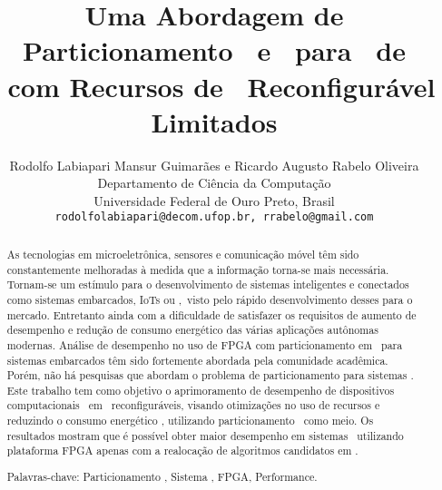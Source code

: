 \documentclass[a4paper, 10pt, conference]{ieeeconf}      %
\title{\LARGE \bf
Uma Abordagem de Particionamento \Hardware\ e \Software\ para \Design\ de \Wearables\ com Recursos de \Hardware\ Reconfigurável Limitados
}
\author{ \parbox{6 in}{\centering Rodolfo Labiapari Mansur Guimarães e Ricardo Augusto Rabelo Oliveira \\
         Departamento de Ciência da Computação\\
         Universidade Federal de Ouro Preto, Brasil\\
         {\tt\small rodolfolabiapari@decom.ufop.br, rrabelo@gmail.com}}
}
\begin{document}
\maketitle
\thispagestyle{empty}
\pagestyle{empty}

\begin{abstract}

As tecnologias em microeletrônica, sensores e comunicação móvel têm sido constantemente melhoradas à medida que a informação torna-se mais necessária. 
Tornam-se um estímulo para o desenvolvimento de sistemas inteligentes e conectados como sistemas embarcados, IoTs ou \wearables,\ visto pelo rápido desenvolvimento desses para o mercado.
Entretanto ainda com a dificuldade de satisfazer os requisitos de aumento de desempenho e redução de consumo energético das várias aplicações autônomas modernas.
%
Análise de desempenho no uso de FPGA com particionamento em \hardware\ para sistemas embarcados têm sido fortemente abordada pela comunidade acadêmica. 
Porém, não há pesquisas que abordam o problema de particionamento para sistemas \wearable.
%
Este trabalho tem como objetivo o aprimoramento de desempenho de dispositivos computacionais \wearables\ em \hardwares\ reconfiguráveis, visando otimizações no uso de recursos e reduzindo o consumo energético%
%
, utilizando particionamento \hs\ como meio.
%
Os resultados mostram que é possível obter maior desempenho em sistemas \wearables\ utilizando plataforma FPGA apenas com a realocação de algoritmos candidatos em \hardware.


Palavras-chave: Particionamento \hs, Sistema \Wearable, FPGA, Performance.
\end{abstract}






\end{document}
